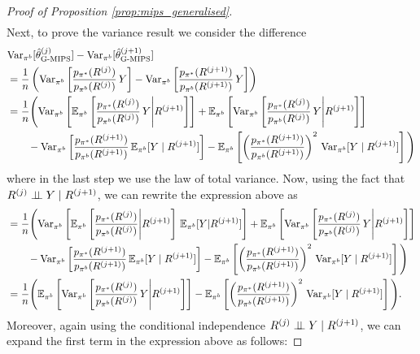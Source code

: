 \begin{proof}[Proof of Proposition \ref{prop:mips_generalised}]
\begin{align*}
    \end{align*}
    Next, to prove the variance result we consider the difference
    \begin{align*}
        &\textup{Var}_{\pi^b}[\hat{\theta}^{(j)}_{\textup{G-MIPS}}] - \textup{Var}_{\pi^b}[\hat{\theta}^{(j+1)}_{\textup{G-MIPS}}] \\
        &= \frac{1}{n}\left(\textup{Var}_{\pi^b}\left[\frac{p_{\pi^*}(R^{(j)})}{p_{\pi^b}(R^{(j)})}\, Y\right] - \textup{Var}_{\pi^b}\left[\frac{p_{\pi^*}(R^{(j+1)})}{p_{\pi^b}(R^{(j+1)})}\, Y\right]\right) \\
        &= \frac{1}{n}\Bigg(\textup{Var}_{\pi^b}\left[ \mathbb{E}_{\pi^b}\left[\frac{p_{\pi^*}(R^{(j)})}{p_{\pi^b}(R^{(j)})}\, Y \Bigg| R^{(j+1)} \right] \right] + \mathbb{E}_{\pi^b}\left[ \textup{Var}_{\pi^b}\left[\frac{p_{\pi^*}(R^{(j)})}{p_{\pi^b}(R^{(j)})}\, Y \Bigg| R^{(j+1)} \right] \right] \\
        &\qquad- \textup{Var}_{\pi^b}\left[\frac{p_{\pi^*}(R^{(j+1)})}{p_{\pi^b}(R^{(j+1)})}\, \mathbb{E}_{\pi^b}[Y\mid R^{(j+1)}]\right] - \mathbb{E}_{\pi^b} \left[\left(\frac{p_{\pi^*}(R^{(j+1)})}{p_{\pi^b}(R^{(j+1)})}\right)^2\,\textup{Var}_{\pi^b}[Y\mid R^{(j+1)}] \right] \Bigg)
    \end{align*}
    where in the last step we use the law of total variance. Now, using the fact that $R^{(j)}\perp \!\!\! \perp Y \mid R^{(j+1)}$, we can rewrite the expression above as
    \begin{align*}
        &= \frac{1}{n}\Bigg(\textup{Var}_{\pi^b}\left[ \mathbb{E}_{\pi^b}\left[\frac{p_{\pi^*}(R^{(j)})}{p_{\pi^b}(R^{(j)})}\Bigg| R^{(j+1)} \right]\, \mathbb{E}_{\pi^b}[Y | R^{(j+1)} ] \right] + \mathbb{E}_{\pi^b}\left[ \textup{Var}_{\pi^b}\left[\frac{p_{\pi^*}(R^{(j)})}{p_{\pi^b}(R^{(j)})}\, Y \Bigg| R^{(j+1)} \right] \right] \\
        &\qquad- \textup{Var}_{\pi^b}\left[\frac{p_{\pi^*}(R^{(j+1)})}{p_{\pi^b}(R^{(j+1)})}\, \mathbb{E}_{\pi^b}[Y\mid R^{(j+1)}]\right] - \mathbb{E}_{\pi^b} \left[\left(\frac{p_{\pi^*}(R^{(j+1)})}{p_{\pi^b}(R^{(j+1)})}\right)^2\,\textup{Var}_{\pi^b}[Y\mid R^{(j+1)}] \right] \Bigg)\\
        &= \frac{1}{n}\Bigg( \mathbb{E}_{\pi^b}\left[ \textup{Var}_{\pi^b}\left[\frac{p_{\pi^*}(R^{(j)})}{p_{\pi^b}(R^{(j)})}\, Y \Bigg| R^{(j+1)} \right] \right] - \mathbb{E}_{\pi^b} \left[\left(\frac{p_{\pi^*}(R^{(j+1)})}{p_{\pi^b}(R^{(j+1)})}\right)^2\,\textup{Var}_{\pi^b}[Y\mid R^{(j+1)}] \right]\Bigg).
    \end{align*}
    Moreover, again using the conditional independence $R^{(j)}\perp \!\!\! \perp Y \mid R^{(j+1)}$, we can expand the first term in the expression above as follows:

\end{proof}
